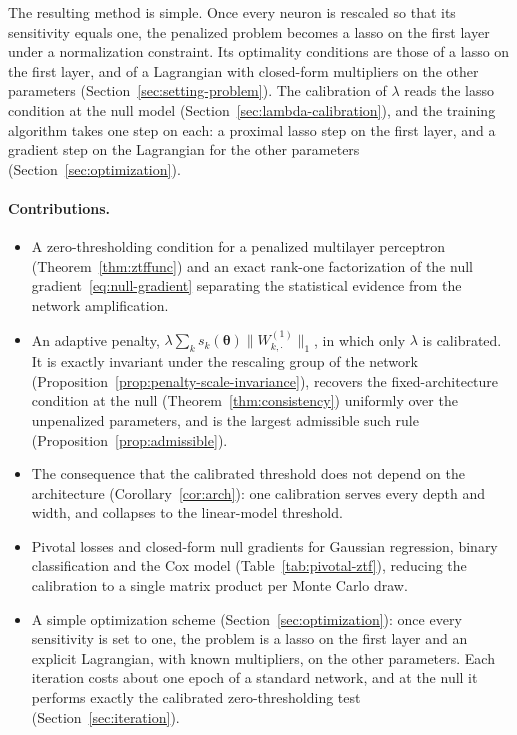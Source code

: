 \documentclass[twoside,11pt]{article}
\newcommand{\bth}{\boldsymbol{\theta}}
\newcommand{\PenWonek}{\|W^{(1)}_{k, \cdot}\|_1}
\begin{document}
The resulting method is simple. Once every neuron is rescaled so that its sensitivity equals one, the penalized problem becomes a lasso on the first layer under a normalization constraint. Its optimality conditions are those of a lasso on the first layer, and of a Lagrangian with closed-form multipliers on the other parameters (Section~\ref{sec:setting-problem}). The calibration of $\lambda$ reads the lasso condition at the null model (Section~\ref{sec:lambda-calibration}), and the training algorithm takes one step on each: a proximal lasso step on the first layer, and a gradient step on the Lagrangian for the other parameters (Section~\ref{sec:optimization}).

\paragraph{Contributions.}
\begin{itemize}
\item A zero-thresholding condition for a penalized multilayer perceptron
      (Theorem~\ref{thm:ztffunc}) and an exact rank-one factorization of the
      null gradient~\eqref{eq:null-gradient} separating the statistical
      evidence from the network amplification.
\item An adaptive penalty, $\lambda\sum_k s_k(\bth)\PenWonek$, in which
      only $\lambda$ is calibrated. It is exactly invariant under the
      rescaling group of the network (Proposition~\ref{prop:penalty-scale-invariance}),
      recovers the fixed-architecture condition at the null
      (Theorem~\ref{thm:consistency}) uniformly over the unpenalized
      parameters, and is the largest admissible such rule
      (Proposition~\ref{prop:admissible}).
\item The consequence that the calibrated threshold does not depend on the
      architecture (Corollary~\ref{cor:arch}): one calibration serves every
      depth and width, and collapses to the linear-model threshold.
\item Pivotal losses and closed-form null gradients for Gaussian regression,
      binary classification and the Cox model (Table~\ref{tab:pivotal-ztf}),
      reducing the calibration to a single matrix product per Monte Carlo draw.
\item A simple optimization scheme (Section~\ref{sec:optimization}): once every
      sensitivity is set to one, the problem is a lasso on the first layer and
      an explicit Lagrangian, with known multipliers, on the other parameters.
      Each iteration costs about one epoch of a standard network, and at the
      null it performs exactly the calibrated zero-thresholding test
      (Section~\ref{sec:iteration}).
\end{itemize}
\end{document}
